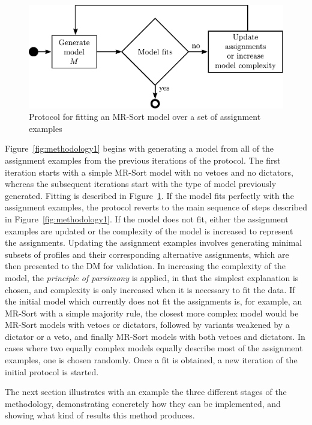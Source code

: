 \begin{figure}
\centering
\includegraphics[scale = 0.7]{fig/expdesign2}
\caption{Protocol for fitting an MR-Sort model over a set of assignment examples}\label{fig:methodology2}
\end{figure}

Figure~\ref{fig:methodology1} begins with generating a model from all of the assignment examples from the previous iterations of the protocol. The first iteration starts with a simple MR-Sort model with no vetoes and no dictators, whereas the subsequent iterations start with the type of model previously generated. Fitting is described in Figure~\ref{fig:methodology2}. If the model fits perfectly with the assignment examples, the protocol reverts to the main sequence of steps described in Figure~\ref{fig:methodology1}. If the model does not fit, either the assignment examples are updated or the complexity of the model is increased to represent the assignments. Updating the assignment examples involves generating minimal subsets of profiles and their corresponding alternative assignments, which are then presented to the DM for validation. In increasing the complexity of the model, the {\em principle of parsimony} is applied, in that the simplest explanation is chosen, and complexity is only increased when it is necessary to fit the data. If the initial model which currently does not fit the assignments is, for example, an MR-Sort with a simple majority rule, the closest more complex model would be MR-Sort models with vetoes or dictators, followed by variants weakened by a dictator or a veto, and finally MR-Sort models with both vetoes and dictators. In cases where two equally complex models equally describe most of the assignment examples, one is chosen randomly. Once a fit is obtained, a new iteration of the initial protocol is started.

The next section illustrates with an example the three different stages of the methodology, demonstrating concretely how they can be implemented, and showing what kind of results this method produces.
